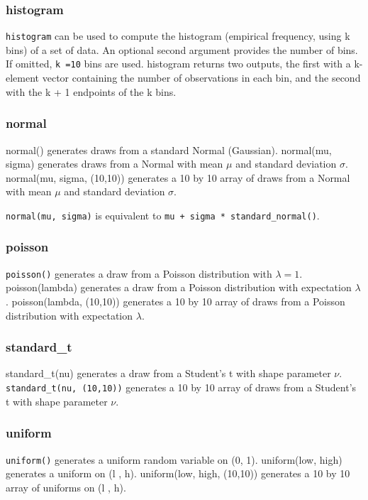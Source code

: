 \documentclass[KSmain.tex]{subfiles}
\begin{document}
\subsubsection{histogram}
\texttt{histogram} can be used to compute the histogram (empirical frequency, using k bins) of a set of data. An
optional second argument provides the number of bins. If omitted, \texttt{k =10} bins are used. histogram returns
two outputs, the first with a k-element vector containing the number of observations in each bin, and the
second with the k + 1 endpoints of the k bins.

\subsubsection{normal}
normal() generates draws from a standard Normal (Gaussian). normal(mu, sigma) generates draws from
a Normal with mean $\mu$ and standard deviation $\sigma$. normal(mu, sigma, (10,10)) generates a 10 by 10 array
of draws from a Normal with mean $\mu$ and standard deviation $\sigma$. 

\texttt{normal(mu, sigma)} is equivalent to \texttt{mu + sigma * standard_normal()}.
\subsubsection{poisson}
\texttt{poisson()} generates a draw from a Poisson distribution with $\lambda = 1$. poisson(lambda) generates a draw
from a Poisson distribution with expectation $\lambda$. poisson(lambda, (10,10)) generates a 10 by 10 array of
draws from a Poisson distribution with expectation $\lambda$.
\subsubsection{standard\_t}
standard\_t(nu) generates a draw from a Student’s t with shape parameter $\nu$. \texttt{standard_t(nu, (10,10))}
generates a 10 by 10 array of draws from a Student’s t with shape parameter $\nu$.
\subsubsection{uniform}
\texttt{uniform()} generates a uniform random variable on (0, 1). uniform(low, high) generates a uniform on
(l , h). uniform(low, high, (10,10)) generates a 10 by 10 array of uniforms on (l , h).
\newpage
\end{document}
